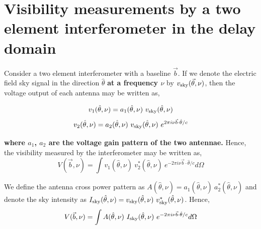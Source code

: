 \documentclass[twocolumn]{emulateapj}
\newcommand{\volt}{{v}}
\newcommand{\vis}{{V}}
\newcommand{\sky}{{\rm sky}}
\newcommand{\bmvolt}{{a}}
\newcommand{\beam}{{A}}
\newcommand{\thhat}{{\hat\theta}}
\newcommand{\fngexp}{{e^{2\pi i\nu\vec{b}\cdot\thhat/c}}}
\newcommand{\ifngexp}{{e^{-2\pi i\nu\vec{b}\cdot\thhat/c}}}
\begin{document}
    
    \section{\textbf{Visibility measurements by a two element interferometer in the delay domain}}

    Consider a two element interferometer with a baseline $\vec b$. If we denote the electric field sky signal in the direction $\thhat$ \textbf{at a frequency $\nu$} by $\volt_\sky(\vec \theta, \nu)$, then the voltage output of each antenna may be written as,  
    
    \begin{equation}
    \volt_{1}(\thhat, \nu) = \bmvolt_{1}(\thhat,\nu)~\volt_\sky(\thhat,\nu)\nonumber\\
    \end{equation}
    \begin{equation}
    \volt_{2} (\thhat, \nu)= \bmvolt_{2}(\thhat,\nu)~\volt_\sky(\thhat,\nu)~\fngexp\nonumber\\
    \end{equation}
    
    \textbf{where $\bmvolt_{1}$, $\bmvolt_{2}$ are the voltage gain pattern of the two antennae.}
    Hence, the visibility measured by the interferometer may be written as, 
    \begin{equation}
    \vis(\vec b, \nu) =  \int  \volt_{1}(\thhat,\nu)~  \volt_{2}^{*} (\thhat, \nu)~ \ifngexp d\Omega
    \label{eq1}
    \end{equation}
    
    We define the antenna cross power pattern as  $\beam(\thhat,\nu)=\bmvolt_{1}(\thhat,\nu)~\bmvolt_{2}^{*}(\thhat,\nu)$ and denote the sky intensity as  $I_\sky(\thhat,\nu)=\volt_\sky(\thhat,\nu)~\volt_\sky^{*}(\thhat,\nu)$. Hence, 
    \begin{equation}
    \vis(\vec b,\nu) = \int \beam(\thhat, \nu)~ I_\sky(\thhat,\nu)~ \ifngexp d\Omega
    \label{eq2}
    \end{equation}
    
\end{document}
